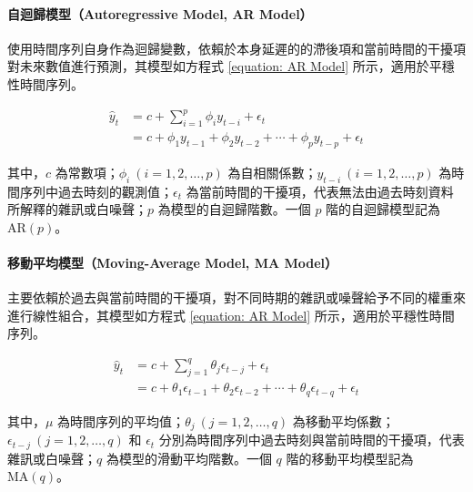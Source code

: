 \paragraph{自迴歸模型（Autoregressive Model, AR Model）} 

使用時間序列自身作為迴歸變數，依賴於本身延遲的的滯後項和當前時間的干擾項對未來數值進行預測，其模型如方程式 \eqref{equation: AR Model} 所示，適用於平穩性時間序列。

\begin{equation}\label{equation: AR Model}
  \begin{split}
    \hat{y}_{t} & = c + \sum_{i = 1}^{p} \phi_{i} y_{t-i} + \epsilon_{t} \\
                & = c + \phi_{1} y_{t-1} + \phi_{2} y_{t-2} + \cdots + \phi_{p} y_{t-p} + \epsilon_{t}
  \end{split}
\end{equation}

其中，$c$ 為常數項；$\phi_i~(i = 1, 2, \ldots, p)$ 為自相關係數；$y_{t - i}~(i = 1, 2, \ldots, p)$ 為時間序列中過去時刻的觀測值；$\epsilon_t$ 為當前時間的干擾項，代表無法由過去時刻資料所解釋的雜訊或白噪聲；$p$ 為模型的自迴歸階數。一個 $p$ 階的自迴歸模型記為 $\text{AR} (p)$。

\paragraph{移動平均模型（Moving-Average Model, MA Model）}

主要依賴於過去與當前時間的干擾項，對不同時期的雜訊或噪聲給予不同的權重來進行線性組合，其模型如方程式 \eqref{equation: AR Model} 所示，適用於平穩性時間序列。

\begin{equation}\label{equation: MA Model}
  \begin{split}
    \hat{y}_{t} & = c + \sum_{j = 1}^{q} \theta_{j} \epsilon_{t-j} + \epsilon_{t} \\
                & = c + \theta_{1} \epsilon_{t-1} + \theta_{2} \epsilon_{t-2} + \cdots + \theta_{q} \epsilon_{t-q} + \epsilon_{t}
  \end{split}
\end{equation}

其中，$\mu$ 為時間序列的平均值；$\theta_{j}~(j = 1, 2, \ldots, q)$ 為移動平均係數；$\epsilon_{t - j}~(j = 1, 2, \ldots, q)$ 和 $\epsilon_t$ 分別為時間序列中過去時刻與當前時間的干擾項，代表雜訊或白噪聲；$q$ 為模型的滑動平均階數。一個 $q$ 階的移動平均模型記為 $\text{MA} (q)$。


